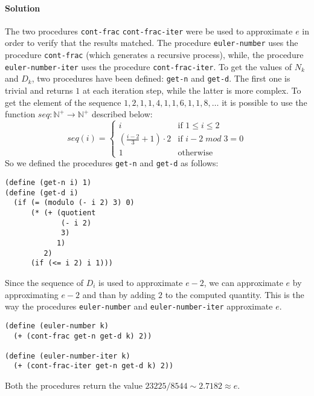 \paragraph{Solution} The two procedures \texttt{cont-frac} \texttt{cont-frac-iter} were be used to approximate $ e $ in order to
verify that the results matched. The procedure \texttt{euler-number} uses the procedure \texttt{cont-frac} (which generates a 
recursive process), while, the procedure \texttt{euler-number-iter} uses the procedure \texttt{cont-frac-iter}.
To get the values of $ N_{k} $ and $ D_{k} $, two procedures have been defined: \texttt{get-n} and \texttt{get-d}. The first one
is trivial and returns $ 1 $ at each iteration step, while the latter is more complex.
To get the element of the sequence $ 1, 2, 1, 1, 4, 1, 1, 6, 1, 1, 8, \dots $ it is possible to use the function
$ seq: \mathbb{N}^{+} \to \mathbb{N}^{+} $ described below:
\[     
  seq(i) = 
  \begin{cases}
      i & \text{if } 1 \leq i \leq 2 \\
      \left(\frac{i - 2}{3} + 1 \right) \cdot 2  & \text{if } i - 2\;mod\;3 = 0\\
      1 & \text{otherwise}
  \end{cases} 
\]
So we defined the procedures \texttt{get-n} and \texttt{get-d} as follows:
\begin{lstlisting}[caption={Definition of the procedures \texttt{get-n} and \texttt{get-d}}, captionpos=b]
(define (get-n i) 1)
(define (get-d i)
  (if (= (modulo (- i 2) 3) 0)
      (* (+ (quotient
             (- i 2)
             3)
            1)
         2)
      (if (<= i 2) i 1)))
\end{lstlisting}
Since the sequence of $ D_{i} $ is used to approximate $ e - 2 $, we can approximate $ e $ by approximating $ e - 2 $ and than
by adding $ 2 $ to the computed quantity. This is the way the procedures \texttt{euler-number} and \texttt{euler-number-iter}
approximate $ e $.
\begin{lstlisting}
(define (euler-number k)
  (+ (cont-frac get-n get-d k) 2))

(define (euler-number-iter k)
  (+ (cont-frac-iter get-n get-d k) 2))
\end{lstlisting}
Both the procedures return the value $ 23225 / 8544 \sim 2.7182 \approx e $.